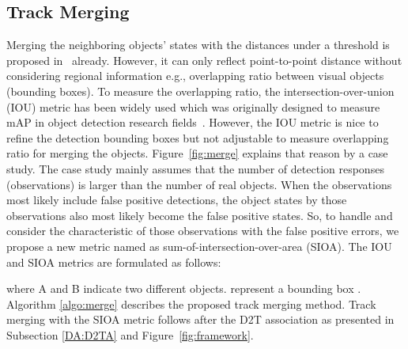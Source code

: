 \documentclass[journal]{IEEEtran}
\newcounter{ct}
\begin{document}
\subsection{Track Merging}
\label{merging}
Merging the neighboring objects' states with the distances under a threshold is proposed in~\cite{gmphd} already.
However, it can only reflect point-to-point distance without considering regional information e.g., overlapping ratio between visual objects (bounding boxes). To measure the overlapping ratio, 
the intersection-over-union (IOU) metric has been widely used which was originally designed to measure mAP in object detection research fields~\cite{voc,imagenet}.
However, the IOU metric is nice to refine the detection bounding boxes but not adjustable to measure overlapping ratio for merging the objects.
Figure~\ref{fig:merge} explains that reason by a case study.
The case study mainly assumes that the number of detection responses (observations) is larger than the number of real objects. When the observations most likely include false positive detections, the object states by those observations also most likely become the false positive states.
So, to handle and consider the characteristic of those observations with the false positive errors, we propose a new metric named as sum-of-intersection-over-area (SIOA).
The IOU and SIOA metrics are formulated as follows:

where A and B indicate two different objects.  represent a bounding box .
Algorithm \ref{algo:merge} describes the proposed track merging method.
Track merging with the SIOA metric follows after the D2T association as presented in Subsection \ref{DA:D2TA} and Figure~\ref{fig:framework}.
\end{document}
